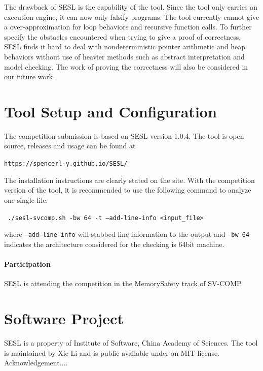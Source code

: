 \documentclass[runningheads]{llncs}
\newcommand{\lx}[1]{\color{teal}{LX: #1 :XL} \color{black}}
\begin{document}
The drawback of \textsc{SESL} is the capability of the tool. Since the tool only carries an execution engine, it can now only falsify  programs. The tool currently cannot give a over-approximation for loop behaviors and recursive function calls. To further specify the obstacles encountered when trying to give a proof of correctness, \textsc{SESL} finds it hard to deal with nondeterministic pointer arithmetic and heap behaviors without use of heavier methods such as abstract interpretation and model checking. The work of proving the correctness will also be considered in our future work.\lx{Add reason for cases we cannot falsify.}


\section{Tool Setup and Configuration}

The competition submission is based on \textsc{SESL} version 1.0.4. The tool is open source, releases and usage can be found at 
\begin{center}

\texttt{https://spencerl-y.github.io/SESL/}
\end{center}

The installation instructions are clearly stated on the site. With the competition version of the tool, it is recommended to use the following command to analyze one single file:

\begin{center}

\texttt{
./sesl-svcomp.sh -bw 64 -t --add-line-info <input\_file>}
\end{center}

where \texttt{--add-line-info} will stabbed line information to the output and \texttt{-bw 64} indicates the architecture considered for the checking is 64bit machine.
\paragraph{Participation} \textsc{SESL} is attending the competition in the MemorySafety track of SV-COMP.


\section{Software Project}

\textsc{SESL} is a property of Institute of Software, China Academy of Sciences. The tool is maintained by Xie Li and is public available under an MIT license. 
\lx{TODO}
Acknowledgement....



%
%
%


\end{document}
